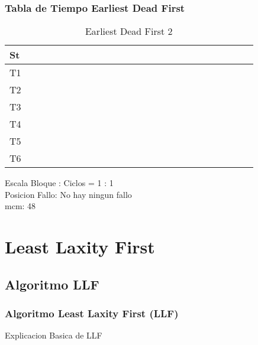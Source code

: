 \documentclass[xcolor=table]{beamer}
\begin{document}
\begin{frame} 
\frametitle{Tabla de Tiempo  Earliest Dead First } 
\begin{table} 
\centering 
\begin{tabular}{|l|l|l|l|l|l|l|l|l|l|l|l|l|l|l|l|l|l|l|l|l|l|l|l|l|} 
\hline 
St & \cellcolor{green} & \cellcolor{green} & \cellcolor{green} & \cellcolor{green} & \cellcolor{green} & \cellcolor{green} & \cellcolor{green} & \cellcolor{green} & \cellcolor{green} & \cellcolor{green} & \cellcolor{green} & \cellcolor{green} & \cellcolor{green} & \cellcolor{green} & \cellcolor{green} & \cellcolor{green} & \cellcolor{green} & \cellcolor{green} & \cellcolor{green} & \cellcolor{green} & \cellcolor{green} & \cellcolor{green} & \cellcolor{green} & \cellcolor{green} \\ \hline 
T1 & & & & & & & & & & & & & & & & & & & & & & & & \\ \hline 
T2 & & & & & & & & & & & & & & & & & & & & & & & & \\ \hline 
T3 & & & & & & & & & & & & & & & & & & & & & & & & \\ \hline 
T4 & & & & & & & & & & & & & & & & & & & & & & & & \\ \hline 
T5 & & & & & & & & & & & & & & & & & & & & & & & & \\ \hline 
T6 & & & & & & & & & & & & & & & & & & & & & & & & \\ \hline 
\end{tabular} 
\caption{ Earliest Dead First 2 } 
\end{table} 
Escala Bloque : Ciclos = 1 : 1 \\ 
Posicion Fallo: No hay ningun fallo \\ 
mcm:  48 \\ 
\end{frame} 


\section{Least Laxity First}

\subsection{Algoritmo LLF}

\begin{frame} 
\frametitle{Algoritmo Least Laxity First (LLF)} 
Explicacion Basica de LLF \\
\end{frame}
\end{document}
